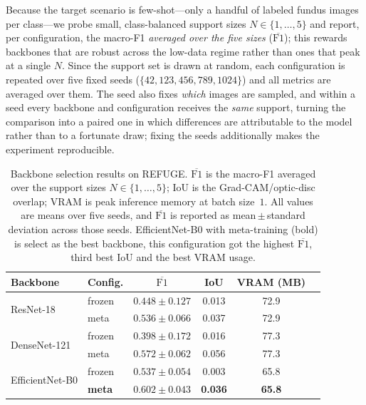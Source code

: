 \documentclass[runningheads]{llncs}
\begin{document}
Because the target scenario is few-shot---only a handful of labeled fundus images per class---we probe small, class-balanced support sizes $N\in\{1,\dots,5\}$ and report, per configuration, the macro-F1 \emph{averaged over the five sizes} ($\overline{\mathrm{F1}}$); this rewards backbones that are robust across the low-data regime rather than ones that peak at a single $N$. Since the support set is drawn at random, each configuration is repeated over five fixed seeds ($\{42,123,456,789,1024\}$) and all metrics are averaged over them. The seed also fixes \emph{which} images are sampled, and within a seed every backbone and configuration receives the \emph{same} support, turning the comparison into a paired one in which differences are attributable to the model rather than to a fortunate draw; fixing the seeds additionally makes the experiment reproducible.

\begin{table}[t]
  \centering
  \caption{Backbone selection results on REFUGE. $\overline{\mathrm{F1}}$ is the
  macro-F1 averaged over the support sizes $N\in\{1,\dots,5\}$; IoU is the
  Grad-CAM/optic-disc overlap; VRAM is peak inference memory at batch size~$1$. All
  values are means over five seeds, and $\overline{\mathrm{F1}}$ is reported as
  mean\,$\pm$\,standard deviation across those seeds. EfficientNet-B0 with meta-training (bold) is select as the best backbone, this configuration got the highest $\overline{\mathrm{F1}}$, third best IoU and the best VRAM usage.}
  \label{tab:selection-results}
    \begin{tabular}{llcccc}
    \toprule
    Backbone & Config. & $\overline{\mathrm{F1}}$ & IoU & VRAM (MB) \\
    \midrule
    \multirow{2}{*}{ResNet-18} & frozen & $0.448\pm0.127$ & 0.013 & 72.9 \\
                              & meta   & $0.536\pm0.066$ & 0.037 & 72.9 \\
    \midrule
    \multirow{2}{*}{DenseNet-121} & frozen & $0.398\pm0.172$ & 0.016 & 77.3 \\
                                  & meta   & $0.572\pm0.062$ & 0.056 & 77.3 \\
    \midrule
    \multirow{2}{*}{EfficientNet-B0} & frozen        & $0.537\pm0.054$ & 0.003 & 65.8 \\
                                    & \textbf{meta} & \textbf{$0.602\pm0.043$} & \textbf{0.036} & \textbf{65.8} \\
    \bottomrule
    \end{tabular}
\end{table}
\end{document}
